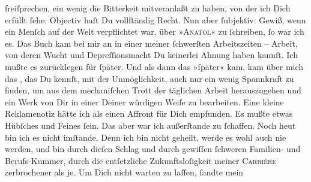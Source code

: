                freiſprechen, ein wenig die Bitterkeit mitveranlaßt zu haben, von der ich Dich
               erfüllt{ }ſehe. Objectiv haſt Du vollſtändig Recht. Nun aber{ }ſubjektiv: Gewiß, wenn ein
               Menſch auf der Welt verpflichtet war, über »\textsc{Anatol}« zu{ }ſchreiben,{ }ſo war ich es. Das Buch kam bei mir an in einer meiner{ }ſchwerſten Arbeitszeiten
               – Arbeit, von deren Wucht und Depreſ{\pb}ſionsmacht Du
               keinerlei Ahnung haben kannſt. Ich mußte es zurücklegen für{ }ſpäter. Und als dann das
               »ſpäter« kam, kam über mich das \label{K_L02709-4v}\label{K_L02709-4}, das Du kennſt, mit der Unmöglichkeit, auch nur ein
               wenig Spannkraft zu finden, um aus dem mechaniſchen Trott der täglichen Arbeit
               herauszugehen und \strikeout{\textcolor{gray}{×}\-\textcolor{gray}{×}} ein Werk von Dir in
               einer Deiner würdigen Weiſe zu bearbeiten. Eine kleine Reklamenotiz hätte ich als
               einen Affront für Dich empfunden. Es mußte etwas Hübſches und Feines {\pb}ſein. Das aber war ich außerſtande zu{ }ſchaffen. Noch
               heut bin ich es nicht imſtande. Denn ich bin nicht geheilt, werde es wohl auch nie
               werden, und bin durch dieſen Schlag und durch gewiſſen{ }ſchweren Familien- und
               Berufs-Kummer, durch die entſetzliche Zukunftsloſigkeit meiner \textsc{Carrière} zerbrochener als je. Um Dich nicht warten zu laſſen,{ }ſandte mein
